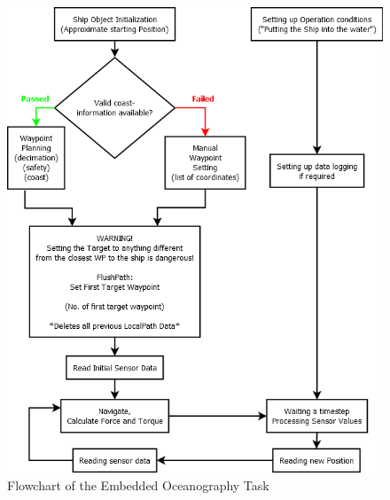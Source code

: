 \begin{figure}
\centering
\includegraphics[width = \textwidth]{img/HLIFigures/System-World_Interactions.png}
\caption{Flowchart of the Embedded Oceanography Task}
\label{fig:EmbFlowchart}
\end{figure}


